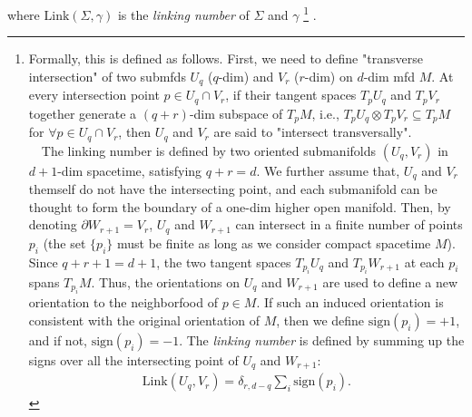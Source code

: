 \documentclass{ltjsarticle}
\theoremstyle{mystyle} %
\numberwithin{equation}{section}
\begin{document}
  where $\mathrm{Link}(\Sigma, \gamma)$ is the \textit{linking number} of $\Sigma$ and $\gamma$
  \footnote{Formally, this is defined as follows. 
  First, we need to define "transverse intersection" of two submfds $U_q$ ($q$-dim) and $V_r$ ($r$-dim) on $d$-dim mfd $M$. 
  At every intersection point $p\in U_{q}\cap V_r$, if 
  their tangent spaces $T_p U_q$ and $T_p V_r$ together generate a $(q+r)$-dim subspace of $T_pM$, i.e., 
  $T_p U_q \otimes T_p V_r \subseteq T_p M$ for $\forall p\in U_{q}\cap V_r$, then 
  $U_q$ and $V_r$ are said to "intersect transversally". \\
　The linking number is defined by two oriented submanifolds $(U_q, V_r)$ in $d+1$-dim spacetime, 
   satisfying $q+r=d$. We further assume that, $U_q$ and $V_r$ themself do not have the intersecting point, 
   and each submanifold can be thought to form the boundary of a one-dim higher open manifold. 
   Then, by denoting $\partial W_{r+1}=V_r$, $U_q$ and $W_{r+1}$ can intersect in a finite number of points ${p_i}$ 
   (the set $\{p_i\}$ must be finite as long as we consider compact spacetime $M$). 
   Since $q+r+1=d+1$, the two tangent spaces $T_{p_i}U_q$ and $T_{p_i}W_{r+1}$ at each $p_i$ spans $T_{p_i}M$. 
   Thus, the orientations on $U_q$ and $W_{r+1}$ are used to define a new orientation to the neighborfood of $p\in M$. 
   If such an induced orientation is consistent with the original orientation of $M$, 
   then we define $\mathrm{sign}(p_i)=+1$, and if not, $\mathrm{sign}(p_i)=-1$. 
   The \textit{linking number} is defined by summing up the signs over all the intersecting point of $U_q$ and $W_{r+1}$: 
   \begin{align}
    \mathrm{Link}(U_q, V_{r}) = \delta_{r, d-q}\sum_{i}\mathrm{sign}(p_i). 
   \end{align}
   }
  . 
\end{document}
